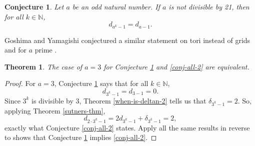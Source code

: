 \documentclass[a4paper]{article}
\newtheorem{theorem}{Theorem}
\newtheorem{conjecture}{Conjecture}
\newcommand{\N}{\mathbb{N}}
\begin{document}
	\begin{conjecture}\label{conj-powers}
		Let $a$ be an odd natural number.
		If $a$ is not divisible by 21, then for all $k \in \N$,
		\begin{equation*}
			d_{a^k - 1} = d_{a-1}.
		\end{equation*}
	\end{conjecture}
	Goshima and Yamagishi conjectured a similar statement on tori instead of grids and for $a$ prime \cite{GOSHIMAYAMAGISHI2010}.
	
	\begin{theorem}
		The case of $a=3$ for Conjecture \ref{conj-powers} and \ref{conj-all-2} are equivalent.
	\end{theorem}
	\begin{proof}
		For $a=3$, Conjecture \ref{conj-powers} says that for all $k \in \N$,
		\begin{equation*}
			d_{3^k - 1} = d_{3-1} = 0.
		\end{equation*}
		Since $3^k$ is divisible by 3, Theorem \ref{when-is-deltan-2} tells us that $\delta_{3^k - 1} = 2$.
		So, applying Theorem \ref{sutners-thm},
		\begin{equation*}
			d_{2\cdot3^{k} - 1} = 2d_{3^k - 1} + \delta_{3^k - 1} = 2,
		\end{equation*}
		exactly what Conjecture \ref{conj-all-2} states.
		Apply all the same results in reverse to shows that Conjecture \ref{conj-powers} implies \ref{conj-all-2}.
	\end{proof}
	
	\newpage
	
	
\end{document}
